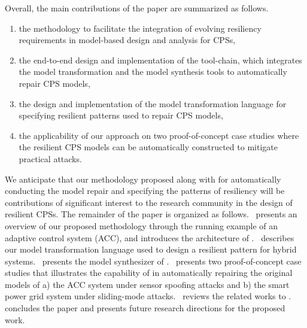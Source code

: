 Overall, the main contributions of the paper are summarized as follows.
%
\begin{enumerate}[leftmargin= 2 em]
\item the methodology to facilitate the integration of evolving resiliency requirements in model-based design and analysis for CPSs,
\item the end-to-end design and implementation of the tool-chain, which integrates the model transformation and the model synthesis tools to automatically repair CPS models,
\item the design and implementation of the model transformation language for specifying resilient patterns used to repair CPS models,
\item the applicability of our approach on two proof-of-concept case studies where the resilient CPS models can be automatically constructed to mitigate practical attacks.
\end{enumerate}
%
We anticipate that our methodology proposed along with \toolreaffirm for automatically conducting the model repair and specifying the patterns of resiliency will be contributions of significant interest to the research community in the design of resilient CPSs.
%
%
The remainder of the paper is organized as follows.~ presents an overview of our proposed methodology through the running example of an adaptive control system (ACC), and introduces the architecture of \toolreaffirm.~ describes our model transformation language used to design a resilient pattern for hybrid systems.~ presents the model synthesizer of \toolreaffirm.~ presents two proof-of-concept case studies that illustrates the capability of \toolreaffirm in automatically repairing the original models of a) the ACC system under sensor spoofing attacks and b) the smart power grid system under sliding-mode attacks.~ reviews the related works to \toolreaffirm.~ concludes the paper and presents future research directions for the proposed work.






